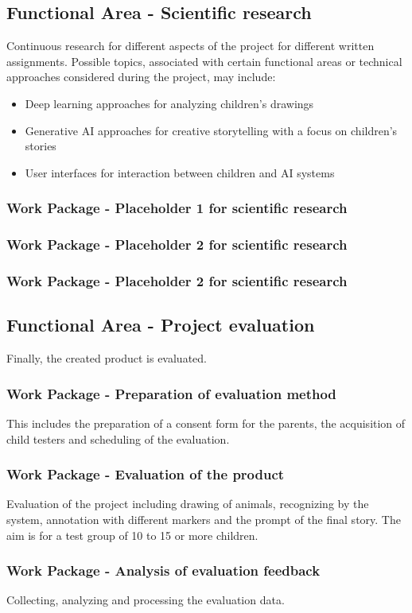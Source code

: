 \subsection{Functional Area - Scientific research}
Continuous research for different aspects of the project for different written assignments.
Possible topics, associated with certain functional areas or technical approaches considered during the project, may include:
\begin{itemize}
	\item Deep learning approaches for analyzing children's drawings
	\item Generative AI approaches for creative storytelling with a focus on children's stories
	\item User interfaces for interaction between children and AI systems
\end{itemize}

\subsubsection{Work Package - Placeholder 1 for scientific research}

\subsubsection{Work Package - Placeholder 2 for scientific research}

\subsubsection{Work Package - Placeholder 2 for scientific research}



\subsection{Functional Area - Project evaluation}
Finally, the created product is evaluated.

\subsubsection{Work Package - Preparation of evaluation method}
This includes the preparation of a consent form for the parents, the acquisition of child testers and scheduling of the evaluation.

\subsubsection{Work Package - Evaluation of the product}
Evaluation of the project including drawing of animals, recognizing by the system, annotation with different markers and the prompt of the final story.
The aim is for a test group of 10 to 15 or more children.

\subsubsection{Work Package - Analysis of evaluation feedback}
Collecting, analyzing and processing the evaluation data.
